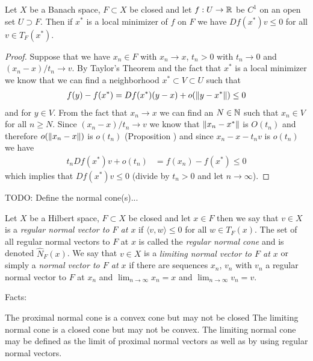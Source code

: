 \begin{thm}\label{LocalConstrainedMinimizerFirstDerivative}Let $X$ be a Banach space, $F \subset X$ be closed and let
  $f : U  \to \mathbb{R}$ be $C^1$ on an open set $U \supset F$.  Then if
  $x^*$ is a local minimizer of $f$ on $F$ we have $Df(x^*) v \leq 0$
  for all $v \in T_F(x^*)$.  
\end{thm}
\begin{proof}
Suppose that we have $x_n \in F$ with $x_n \to x$, $t_n>0$ with $t_n \to 0$
and $(x_n - x)/t_n \to v$.  By Taylor's Theorem and the fact that
$x^*$ is a local minimizer we know that we
can find a neighborhood $x^* \subset V \subset U$ such that
\begin{align*}
f(y)  - f(x^*) = Df(x^*) (y - x) + o(\lVert y - x^* \rVert) \leq 0
\end{align*}
and for $y \in V$.  From the fact that $x_n \to x$ we can find an $N \in \mathbb{N}$ such
that $x_n \in V$ for all $n \geq N$.  Since $(x_n - x)/t_n \to v$ we
know that $\lVert x_n -x^* \rVert$ is $O(t_n)$ and therefore $o(\lVert x_n -
  x \rVert)$ is $o(t_n)$ (Proposition \label{LandauNotationIdentities}) and since $x_n - x -t_nv$ is $o(t_n)$ we have
\begin{align*}
t_n Df(x^*) v + o(t_n) &= f(x_n) - f(x^*) \leq 0
\end{align*}
which implies that $Df(x^*) v \leq 0$ (divide by $t_n>0$ and let $n
\to \infty$).
\end{proof}

TODO: Define the normal cone(s)...
\begin{defn}Let $X$ be a Hilbert space, $F \subset X$ be closed and let
  $x \in F$ then we say that $v \in X$ is a \emph{regular normal
    vector to $F$ at $x$} if $\langle v, w \rangle \leq 0$ for all $w
  \in T_F(x)$.  The set of all regular normal vectors to $F$ at $x$ is
 called the \emph{regular normal cone} and is denoted
 $\widehat{N}_F(x)$.  We say that $v \in X$ is a \emph{limiting normal vector to $F$
    at $x$} or simply a \emph{normal vector to $F$
    at $x$} if there are sequences $x_n$, $v_n$ with $v_n$ a regular
  normal vector to $F$ at $x_n$ and $\lim_{n \to \infty} x_n = x$ and $\lim_{n \to \infty}
  v_n =v$.
\end{defn}

Facts:

The proximal normal cone is a convex cone but may not be closed
The limiting normal cone is a closed cone but may not be convex.
The limiting normal cone may be defined as the limit of proximal
normal vectors as well as by using regular normal vectors.

